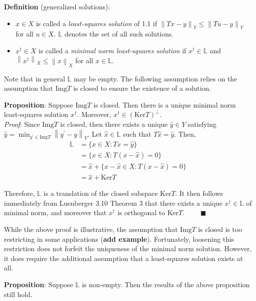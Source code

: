 \documentclass[12pt]{amsart}
\newcommand*{\norm}[1]{\left\lVert#1\right\rVert}
\newcommand{\Img}{\mathrm{Img}}
\newcommand{\Ker}{\mathrm{Ker}}
\begin{document}
 \textbf{Definition} (generalized solutions): 
 \begin{itemize}
 \item $x \in X$ is called a \textit{least-squares solution} of 1.1 if $\norm{Tx - y}_Y \leq \norm{Tu - y}_Y$ for all $u \in X$. $\mathbb{L}$ denotes the set of all such solutions. 
 \item $x^\dagger \in X$ is called a \textit{minimal norm least-squares solution} if $x^\dagger \in \mathbb{L}$ and $\norm{x^\dagger}_X \leq \norm{x}_X$ for all $x \in \mathbb{L}$. 
 \end{itemize} 
 
 Note that in general $\mathbb{L}$ may be empty. The following assumption relies on the assumption that $\Img T$ is closed to ensure the existence of a solution. 
 
 \textbf{Proposition}: Suppose $\Img T$ is closed. Then there is a unique minimal norm least-squares solution $x^\dagger$. Moreover, $x^\dagger \in (\Ker T)^\perp$. \\[.1cm]
 
 \textit{Proof}: Since $\Img T$ is closed, then there exists a unique $\hat{y} \in Y$ satisfying $\hat{y} = \min_{y^\prime \in \Img T} \norm{y^\prime - y}_{Y}$. Let $\hat{x} \in \mathbb{L}$ such that $T\hat{x} = \hat{y}$. Then, 
 \begin{align*} 
 \mathbb{L} &= \{x \in X: Tx = \hat{y}\} \\
                   &= \{x \in X: T(x - \hat{x}) = 0\} \\
                   &= \hat{x} + \{x - \hat{x} \in X: T(x - \hat{x}) = 0\} \\
                   &= \hat{x} + \Ker T
 \end{align*}  
 
 Therefore, $ \mathbb{L}$ is a translation of the closed subspace $\Ker T$. It then follows immediately from Luenberger 3.10 Theorem 3 that there exists a unique $x^\dagger \in \mathbb{L}$ of minimal norm, and moreover that $x^\dagger$ is orthogonal to $\Ker T$. $\qquad \blacksquare$
 
 While the above proof is illustrative, the assumption that $\Img T$ is closed is too restricting in some applications (\textbf{add example}). Fortunately, loosening this restriction does not forfeit the uniqueness of the minimal norm solution. However, it does require the additional assumption that a least-squares solution exists at all. 
 
 \textbf{Proposition}: Suppose $\mathbb{L}$ is non-empty. Then the results of the above proposition still hold. 
 
\end{document}
